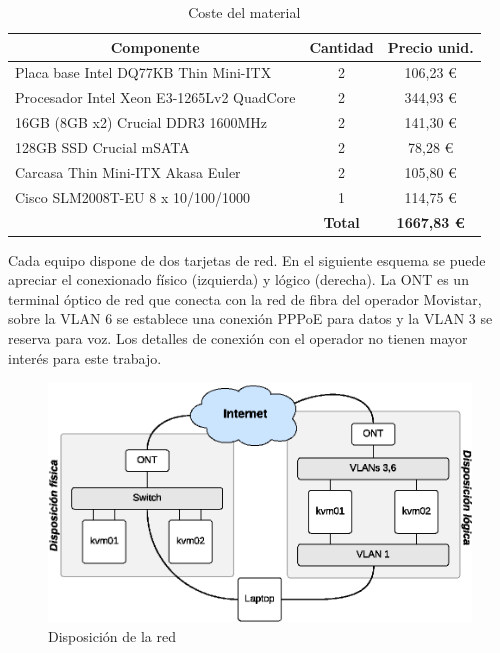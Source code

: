 \documentclass[a4paper,12pt,spanish,final]{epsc_tfc_pfc}
\begin{document}
\begin{table}[h]
  \centering
  \begin{tabular}{l|c|c|}
    \hline
    \multicolumn{1}{|c|}{\textbf{Componente}}                       & \textbf{Cantidad} & \textbf{Precio unid.}  \\ \hline
    \multicolumn{1}{|l|}{Placa base Intel DQ77KB Thin Mini-ITX}     & 2                 & 106,23 \euro           \\ \hline
    \multicolumn{1}{|l|}{Procesador Intel Xeon E3-1265Lv2 QuadCore} & 2                 & 344,93 \euro           \\ \hline
    \multicolumn{1}{|l|}{16GB (8GB x2) Crucial DDR3 1600MHz}        & 2                 & 141,30 \euro           \\ \hline
    \multicolumn{1}{|l|}{128GB SSD Crucial mSATA}                   & 2                 & 78,28 \euro            \\ \hline
    \multicolumn{1}{|l|}{Carcasa Thin Mini-ITX Akasa Euler}         & 2                 & 105,80 \euro           \\ \hline
    \multicolumn{1}{|l|}{Cisco SLM2008T-EU 8 x 10/100/1000}         & 1                 & 114,75 \euro           \\ \hline
                                                                    & \textbf{Total}    & \textbf{1667,83 \euro} \\ \cline{2-3}
  \end{tabular}
  \caption{Coste del material}
\end{table}

Cada equipo dispone de dos tarjetas de red. En el siguiente esquema se puede apreciar el conexionado físico (izquierda) y lógico (derecha). La ONT es un terminal óptico de red que conecta con la red de fibra del operador Movistar, sobre la VLAN 6 se establece una conexión PPPoE para datos y la VLAN 3 se reserva para voz. Los detalles de conexión con el operador no tienen mayor interés para este trabajo.

\begin{figure}[h]
  \centering
    \includegraphics[scale=1]{layout}
      \caption{Disposición de la red}
\end{figure}
\end{document}
